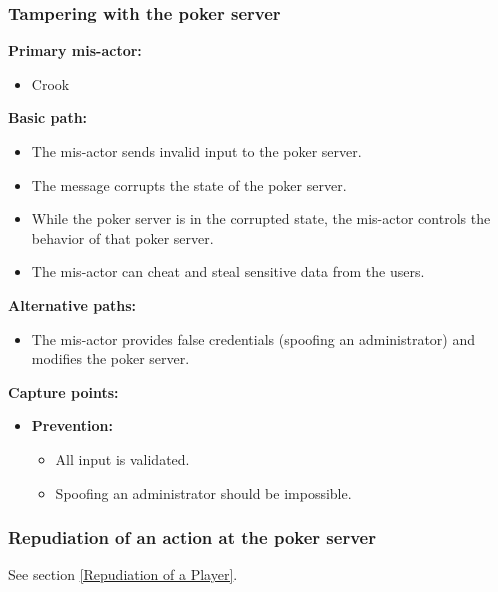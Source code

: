 \documentclass[a4paper,11pt]{report}
\begin{document}
\subsubsection{Tampering with the poker server}
\textbf{Primary mis-actor:}
\begin{itemize}
\item Crook
\end{itemize}
\textbf{Basic path:}
\begin{itemize}
\item The mis-actor sends invalid input to the poker server.
\item The message corrupts the state of the poker server. 
\item While the poker server is in the corrupted state, the mis-actor controls the behavior of that poker server.
\item The mis-actor can cheat and steal sensitive data from the users.
\end{itemize}
\textbf{Alternative paths:}
\begin{itemize}
\item The mis-actor provides false credentials (spoofing an administrator) and modifies the poker server.
\end{itemize}
\textbf{Capture points:}
\begin{itemize}
\item \textbf{Prevention:}
\begin{itemize}
\item All input is validated.
\item Spoofing an administrator should be impossible.
\end{itemize}
\end{itemize}

\subsubsection{Repudiation of an action at the poker server}
See section \ref{Repudiation of a Player}.
\end{document}
